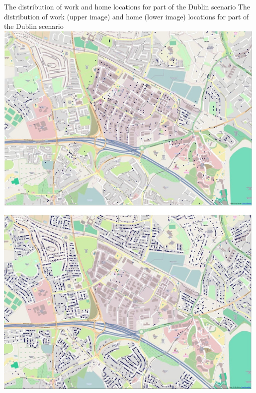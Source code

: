 \createfigure%
{The distribution of work and home locations for part of the Dublin scenario}%
{The distribution of work (upper image) and home (lower image) locations for part of the Dublin scenario}%
{\label{fig:dublin0}}%
{\includegraphics[width=0.99\textwidth, angle=0]{scenarios/figures/dublin0.png}}%
{}

